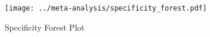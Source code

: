 \begin{figure}[p]
\centering

\texttt{[image: ../meta-analysis/specificity\_forest.pdf]}

\caption[Specificity Forest Plot]{Specificity Forest Plot}
\label{fig:specificity_forest}
\end{figure}
